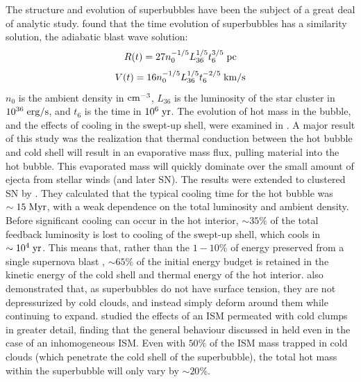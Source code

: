 The structure and evolution of superbubbles have been the subject of a great
deal of analytic study.  \citet{Castor1975} found that the time evolution of
superbubbles has a similarity solution, the \citet{Sedov1959} adiabatic blast
wave solution: 
\begin{equation}
    R(t)=27n_0^{-1/5}L_{36}^{1/5}t_6^{3/5}\;\rm{pc} 
\end{equation}
\begin{equation}
    V(t)=16n_0^{-1/5}L_{36}^{1/5}t_6^{-2/5}\;\rm{km/s}
\end{equation}
$n_0$ is the ambient density in $\rm{cm^{-3}}$, $L_{36}$ is the luminosity of
the star cluster in $10^{36}\;\rm{erg/s}$, and $t_6$ is the time in
$10^6\;\rm{yr}$.  The evolution of hot mass in the bubble, and the effects of
cooling in the swept-up shell, were examined in \citet{Weaver1977}.  A major
result of this study was the realization that thermal conduction between the hot
bubble and cold shell will result in an evaporative mass flux, pulling material
into the hot bubble.  This evaporated mass will quickly dominate over the small
amount of ejecta from stellar winds (and later SN).  The \citet{Weaver1977}
results were extended to clustered SN by \citet{MacLow1988}.  They calculated
that the typical cooling time for the hot bubble was $\sim15\;\rm{Myr}$, with a
weak dependence on the total luminosity and ambient density.  Before significant
cooling can occur in the hot interior, $\sim35\%$ of the total feedback
luminosity is lost to cooling of the swept-up shell, which cools in
$\sim10^4\;\rm{yr}$.  This means that, rather than the $1-10\%$ of energy 
preserved from a single supernova blast \citep{Chevalier1974}, $\sim65\%$ of the
initial energy budget is retained in the kinetic energy of the cold shell and
thermal energy of the hot interior.  \citet{MacLow1988} also demonstrated that,
as superbubbles do not have surface tension, they are not depressurized by cold
clouds, and instead simply deform around them while continuing to expand.
\citet{Silich1996} studied the effects of an ISM permeated with cold clumps in
greater detail, finding that the general behaviour discussed in
\citet{MacLow1988} held even in the case of an inhomogeneous ISM.  Even with
$50\%$ of the ISM mass trapped in cold clouds (which penetrate the cold shell of
the superbubble), the total hot mass within the superbubble will only vary by
$\sim20\%$.

